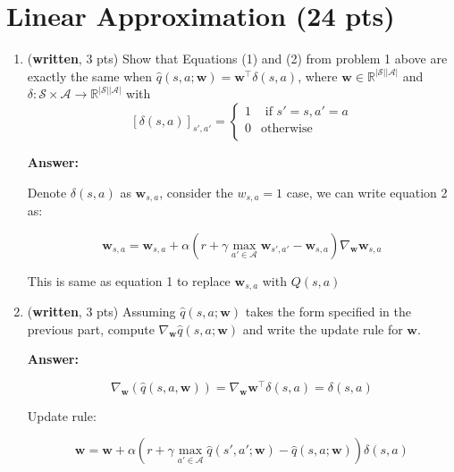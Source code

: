 \documentclass{article}
\begin{document}
\section{Linear Approximation (24 pts)}
\begin{enumerate}
\item (\textbf{written}, 3 pts) Show that Equations (1) and (2) from problem 1 above are exactly the same when  $\hat{q}(s, a; \mathbf{w}) = \mathbf{w}^\top \delta(s,a)$, where $\mathbf{w} \in \mathbb{R}^{\vert\mathcal{S}\vert \vert \mathcal{A}\vert }$ and $\delta : \mathcal{S} \times \mathcal{A} \rightarrow \mathbb{R}^{|\mathcal{S}| |\mathcal{A}|}$ with
\[
    [\delta(s,a)]_{s',a'}=\left\{
                \begin{array}{ll}
                  1 & \text{ if } s'=s, a'=a\\
                  0 & \text{otherwise}\\
                \end{array}
              \right.
  \]

\textbf{Answer:}

Denote $\delta(s,a)$ as $\mathbf{w}_{s,a}$, consider the $w_{s,a} = 1$ case, we can write equation 2 as:

\[
\mathbf{w}_{s,a} = \mathbf{w}_{s,a} + \alpha\left(r+\gamma \max_{a' \in \mathcal{A}}\mathbf{w}_{s',a'} - \mathbf{w}_{s,a}\right) \nabla_{\mathbf{w}} \mathbf{w}_{s,a}
\]

This is same as equation 1 to replace $\mathbf{w}_{s,a}$ with $Q(s,a)$

\item (\textbf{written}, 3 pts) Assuming $\hat{q}(s, a; \mathbf{w})$ takes the form specified in the previous part, compute $\nabla_{\mathbf{w}} \hat{q}(s, a; \mathbf{w})$ and write the update rule for $\mathbf{w}$.

\textbf{Answer:}

\[
 \nabla_{\mathbf{w}}( \hat{q}(s, a,\mathbf{w})) = \nabla_{\mathbf{w}}\mathbf{w}^\top \delta(s,a) = \delta(s,a)
\]

Update rule:

\[
\mathbf{w} = \mathbf{w} + \alpha\left(r+\gamma \max_{a' \in \mathcal{A}} \hat{q}\left(s', a'; \mathbf{w} \right) - \hat{q}\left(s, a; \mathbf{w} \right)\right) \delta(s,a)
\]


\end{enumerate}
\end{document}
